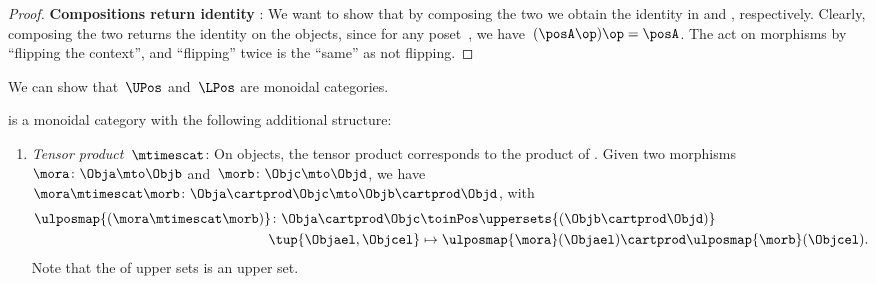 \begin{proof}
    \textbf{Compositions return identity }:
    We want to show that by composing the two  we obtain the identity  in \UPos and \LPos, respectively.
    Clearly, composing the two  returns the identity on the objects, since for any poset~\posA, we have~$(\posA\op)\op=\posA$.
    The  act on morphisms by ``flipping the context'', and ``flipping'' twice is the ``same'' as not flipping.
\end{proof}

We can show that~$\UPos$ and~$\LPos$ are monoidal categories.

\begin{lemma}
    \label{lem:upos_moncat}
    \UPos is a monoidal category with the following additional structure:
    \begin{enumerate}
        \item \emph{Tensor product~$\mtimescat$}: On objects, the tensor product corresponds to the product of .
              Given two morphisms~$\mora\colon \Obja\mto \Objb$ and~$\morb\colon \Objc\mto \Objd$, we have~$\mora \mtimescat \morb\colon  \Obja \cartprod \Objc \mto \Objb\cartprod \Objd$, with
              \begin{equation}
                  \begin{aligned}
                      \ulposmap{(\mora\mtimescat \morb)}\colon \Obja \cartprod \Objc & \toinPos \uppersets{(\Objb\cartprod \Objd)} \\
                      \tup{\Objael,\Objcel}                                          & \mapsto \ulposmap{\mora}(\Objael)\cartprod \ulposmap{\morb}(\Objcel).
                  \end{aligned}
              \end{equation}
              Note that the  of upper sets is an upper set.


\end{enumerate}
\end{lemma}
